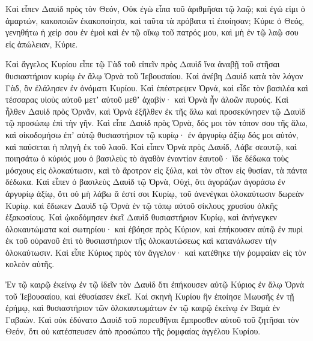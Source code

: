 {Καὶ εἶπεν Δαυὶδ πρὸς τὸν Θεόν, Οὐκ ἐγὼ εἶπα τοῦ ἀριθμῆσαι τῷ λαῷ; καὶ ἐγώ εἰμι ὁ ἁμαρτών, κακοποιῶν ἐκακοποίησα, καὶ ταῦτα τὰ πρόβατα τί ἐποίησαν; Κύριε ὁ Θεός, γενηθήτω ἡ χείρ σου ἐν ἐμοὶ καὶ ἐν τῷ οἴκῳ τοῦ πατρός μου, καὶ μὴ ἐν τῷ λαῷ σου εἰς ἀπώλειαν, Κύριε.
\par }{\PP {}Καὶ ἄγγελος Κυρίου εἶπε τῷ Γὰδ τοῦ εἰπεῖν πρὸς Δαυὶδ ἵνα ἀναβῇ τοῦ στῆσαι θυσιαστήριον κυρίῳ ἐν ἅλῳ Ὀρνὰ τοῦ Ἰεβουσαίου.
Καὶ ἀνέβη Δαυὶδ κατὰ τὸν λόγον Γὰδ, ὃν ἐλάλησεν ἐν ὀνόματι Κυρίου.
Καὶ ἐπέστρεψεν Ὀρνά, καὶ εἶδε τὸν βασιλέα καὶ τέσσαρας υἱοὺς αὐτοῦ μετʼ αὐτοῦ μεθʼ ἁχαβίν· καὶ Ὀρνὰ ἦν ἀλοῶν πυρούς.
Καὶ ἦλθεν Δαυὶδ πρὸς Ὀρνᾶν, καὶ Ὀρνὰ ἐξῆλθεν ἐκ τῆς ἅλω καὶ προσεκύνησεν τῷ Δαυὶδ τῷ προσώπῳ ἐπὶ τὴν γῆν.
Καὶ εἶπε Δαυὶδ πρὸς Ὀρνὰ, δός μοι τὸν τόπον σου τῆς ἅλω, καὶ οἰκοδομήσω ἐπʼ αὐτῷ θυσιαστήριον τῷ κυρίῳ· ἐν ἀργυρίῳ ἀξίῳ δός μοι αὐτόν, καὶ παύσεται ἡ πληγὴ ἐκ τοῦ λαοῦ.
Καὶ εἶπεν Ὀρνὰ πρὸς Δαυίδ, Λάβε σεαυτῷ, καὶ ποιησάτω ὁ κύριός μου ὁ βασιλεὺς τὸ ἀγαθὸν ἐναντίον ἑαυτοῦ· ἴδε δέδωκα τοὺς μόσχους εἰς ὁλοκαύτωσιν, καὶ τὸ ἄροτρον εἰς ξύλα, καὶ τὸν σῖτον εἰς θυσίαν, τὰ πάντα δέδωκα.
Καὶ εἶπεν ὁ βασιλεὺς Δαυὶδ τῷ Ὀρνὰ, Οὐχὶ, ὅτι ἀγοράζων ἀγοράσω ἐν ἀργυρίῳ ἀξίῳ, ὅτι οὐ μὴ λάβω ἅ ἐστί σοι Κυρίῳ, τοῦ ἀνενέγκαι ὁλοκαύτωσιν δωρεὰν Κυρίῳ.
καὶ ἔδωκεν Δαυὶδ τῷ Ὀρνὰ ἐν τῷ τόπῳ αὐτοῦ σίκλους χρυσίου ὁλκῆς ἑξακοσίους.
Καὶ ᾠκοδόμησεν ἐκεῖ Δαυὶδ θυσιαστήριον Κυρίῳ, καὶ ἀνήνεγκεν ὁλοκαυτώματα καὶ σωτηρίου· καὶ ἐβόησε πρὸς Κύριον, καὶ ἐπήκουσεν αὐτῷ ἐν πυρὶ ἐκ τοῦ οὐρανοῦ ἐπὶ τὸ θυσιαστήριον τῆς ὁλοκαυτώσεως καὶ κατανάλωσεν τὴν ὁλοκαύτωσιν.
Καὶ εἶπε Κύριος πρὸς τὸν ἄγγελον· καὶ κατέθηκε τὴν ῥομφαίαν εἰς τὸν κολεὸν αὐτῆς.
\par }{\PP {}Ἐν τῷ καιρῷ ἐκείνῳ ἐν τῷ ἰδεῖν τὸν Δαυὶδ ὅτι ἐπήκουσεν αὐτῷ Κύριος ἐν ἅλῳ Ὀρνὰ τοῦ Ἰεβουσαίου, καὶ ἐθυσίασεν ἐκεῖ.
Καὶ σκηνὴ Κυρίου ἣν ἐποίησε Μωυσῆς ἐν τῇ ἐρήμῳ, καὶ θυσιαστήριον τῶν ὁλοκαυτωμάτων ἐν τῷ καιρῷ ἐκείνῳ ἐν Βαμὰ ἐν Γαβαών.
Καὶ οὐκ ἐδύνατο Δαυὶδ τοῦ πορευθῆναι ἔμπροσθεν αὐτοῦ τοῦ ζητῆσαι τὸν Θεόν, ὅτι οὐ κατέσπευσεν ἀπὸ προσώπου τῆς ῥομφαίας ἀγγέλου Κυρίου.

}

